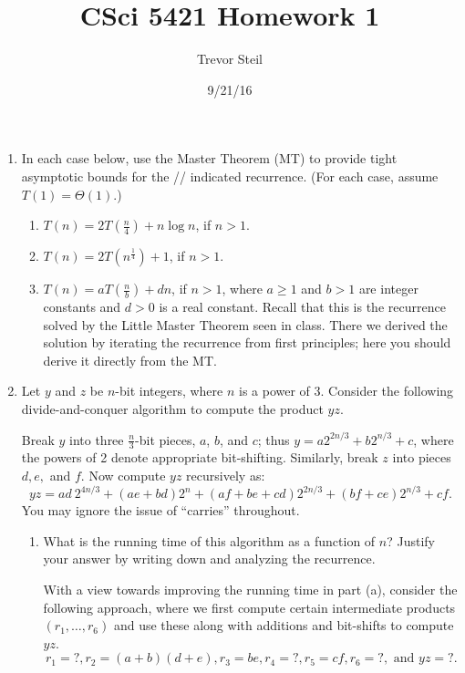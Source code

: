 \documentclass[a4paper]{article}
\title{CSci 5421 Homework 1 }
\date{9/21/16}
\author{Trevor Steil}
\begin{document}
\maketitle

\begin{enumerate}
  \item In each case below, use the Master Theorem (MT) to provide tight asymptotic bounds for the //
    indicated recurrence. (For each case, assume $T(1) = \Theta(1)$.)

    \begin{enumerate}
      \item $T(n) = 2 T( \frac{n}{4} ) + n \log n$, if $n > 1$.
      \item $T(n) = 2 T( n^{\frac{1}{4}} ) + 1$, if $n > 1$.
      \item $T(n) = a T( \frac{n}{b} ) + dn$, if $n > 1$, where $ a \geq 1$ and $b > 1$ are integer constants and $d>0$ is a real constant. Recall
        that this is the recurrence solved by the Little Master Theorem seen in class. There we derived the solution by iterating the recurrence from
        first principles; here you should derive it directly from the MT.
    \end{enumerate}

  \item
    Let $y$ and $z$ be $n$-bit integers, where $n$ is a power of 3. Consider the following divide-and-conquer algorithm to compute the product $yz$.

    Break $y$ into three $\frac{n}{3}$-bit pieces, $a$, $b$, and $c$; thus $y = a 2^{2n/3} + b 2^{n/3} + c$, where the powers of 2 denote appropriate
    bit-shifting. Similarly, break $z$ into pieces $d,e,$ and $f$. Now compute $yz$ recursively as:
    \[ yz = ad \ 2^{4n/3} + (ae+bd) 2^n + (af + be +cd) 2^{2n/3} + (bf+ce)2^{n/3} + cf. \]
    You may ignore the issue of ``carries'' throughout.
    \begin{enumerate}
      \item  What is the running time of this algorithm as a function of $n$? Justify your answer by writing down and analyzing the recurrence.

        With a view towards improving the running time in part (a), consider the following approach, where we first compute certain intermediate
        products $(r_1, \dots, r_6)$ and use these along with additions and bit-shifts to compute $yz$.
        \[ r_1 = ?, r_2 = (a+b)(d+e), r_3 = be, r_4 = ?, r_5 = cf, r_6 = ?, \text{ and } yz=? .\]


\end{enumerate}
\end{enumerate}
\end{document}
